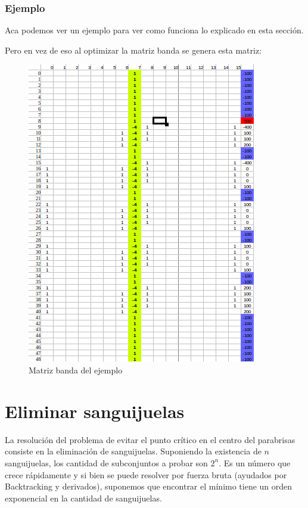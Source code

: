 \subsubsection{Ejemplo}

Aca podemos ver un ejemplo para ver como funciona lo explicado en esta sección.


Pero en vez de eso al optimizar la matriz banda se genera esta matriz:

\begin{figure}
\begin{center}
\includegraphics[scale=0.70]{imagenes/matrizbandaej.png} 
\caption{Matriz banda del ejemplo} 
\end{center}
\end{figure}




\section{Eliminar sanguijuelas}

La resolución del problema de evitar el punto crítico en el centro del parabrisas consiste en la eliminación de sanguijuelas. Suponiendo la existencia de $n$ sanguijuelas, los cantidad de subconjuntos a probar son $2^n$. Es un número que crece rápidamente y si bien se puede resolver por fuerza bruta (ayudados por Backtracking y derivados), suponemos que encontrar el mínimo tiene un orden exponencial en la cantidad de sanguijuelas.

